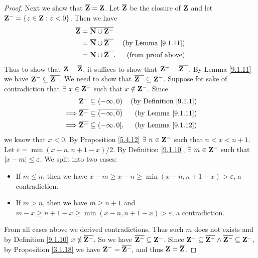 \begin{proof}
    Next we show that \(\overline{\mathbf{Z}} = \mathbf{Z}\).
    Let \(\overline{\mathbf{Z}}\) be the closure of \(\mathbf{Z}\) and let \(\mathbf{Z}^- = \{z \in \mathbf{Z} : z < 0\}\).
    Then we have
    \begin{align*}
        \overline{\mathbf{Z}} & = \overline{\mathbf{N} \cup \mathbf{Z}^-}                                             \\
                      & = \overline{\mathbf{N}} \cup \overline{\mathbf{Z}^-} & \text{(by Lemma \ref{9.1.11})} \\
                      & = \mathbf{N} \cup \overline{\mathbf{Z}^-}.           & \text{(from proof above)}
    \end{align*}
    Thus to show that \(\mathbf{Z} = \overline{\mathbf{Z}}\), it suffices to show that \(\mathbf{Z}^- = \overline{\mathbf{Z}^-}\).
    By Lemma \ref{9.1.11} we have \(\mathbf{Z}^- \subseteq \overline{\mathbf{Z}^-}\).
    We need to show that \(\overline{\mathbf{Z}^-} \subseteq \mathbf{Z}^-\).
    Suppose for sake of contradiction that \(\exists\ x \in \overline{\mathbf{Z}^-}\) such that \(x \notin \mathbf{Z}^-\).
    Since
    \begin{align*}
                 & \mathbf{Z}^- \subseteq (-\infty, 0)                       & \text{(by Definition \ref{9.1.1})} \\
        \implies & \overline{\mathbf{Z}^-} \subseteq \overline{(-\infty, 0)} & \text{(by Lemma \ref{9.1.11})}     \\
        \implies & \overline{\mathbf{Z}^-} \subseteq (-\infty, 0],           & \text{(by Lemma \ref{9.1.12})}
    \end{align*}
    we know that \(x < 0\).
    By Proposition \ref{5.4.12} \(\exists\ n \in \Z^-\) such that \(n < x < n + 1\).
    Let \(\varepsilon = \min(x - n, n + 1 - x) / 2\).
    By Definition \ref{9.1.10}, \(\exists\ m \in \mathbf{Z}^-\) such that \(\left\lvert x - m\right\rvert \leq \varepsilon\).
    We split into two cases:
    \begin{itemize}
        \item If \(m \leq n\), then we have \(x - m \geq x - n \geq \min(x - n, n + 1 - x) > \varepsilon\), a contradiction.
        \item If \(m > n\), then we have \(m \geq n + 1\) and \(m - x \geq n + 1 - x \geq \min(x - n, n + 1 - x) > \varepsilon\), a contradiction.
    \end{itemize}
    From all cases above we derived contradictions.
    Thus such \(m\) does not exists and by Definition \ref{9.1.10} \(x \notin \overline{\mathbf{Z}^-}\).
    So we have \(\overline{\mathbf{Z}^-} \subseteq \mathbf{Z}^-\).
    Since \(\mathbf{Z}^- \subseteq \overline{\mathbf{Z}^-} \land \overline{\mathbf{Z}^-} \subseteq \mathbf{Z}^-\), by Proposition \ref{3.1.18} we have \(\mathbf{Z}^- = \overline{\mathbf{Z}^-}\), and thus \(\mathbf{Z} = \overline{\mathbf{Z}}\).


\end{proof}
